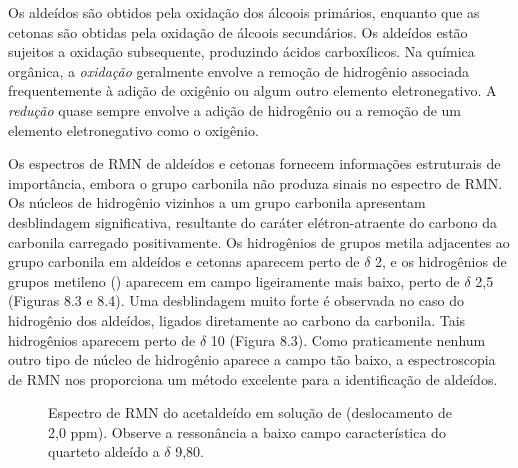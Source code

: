 \begin{tightcenter}
    \qquad
    \qquad
    \qquad
\end{tightcenter}


Os aldeídos são obtidos pela oxidação dos álcoois primários, enquanto que as cetonas são obtidas pela oxidação de álcoois secundários. Os aldeídos estão sujeitos a oxidação subsequente, produzindo ácidos carboxílicos. Na química orgânica, a \textit{oxidação} geralmente envolve a remoção de hidrogênio associada frequentemente à adição de oxigênio ou algum outro elemento eletronegativo. A \textit{redução} quase sempre envolve a adição de hidrogênio ou a remoção de um elemento eletronegativo como o oxigênio.


Os espectros de RMN de aldeídos e cetonas fornecem informações estruturais de importância, embora o grupo carbonila não produza sinais no espectro de RMN. Os núcleos de hidrogênio vizinhos a um grupo carbonila apresentam desblindagem significativa, resultante do caráter elétron-atraente do carbono da carbonila carregado positivamente. Os hidrogênios de grupos metila adjacentes ao grupo carbonila em aldeídos e cetonas aparecem perto de $\delta$ 2, e os hidrogênios de grupos metileno () aparecem em campo ligeiramente mais baixo, perto de $\delta$ 2,5 (Figuras 8.3 e 8.4). Uma desblindagem muito forte é observada no caso do hidrogênio dos aldeídos, ligados diretamente ao carbono da carbonila. Tais hidrogênios aparecem perto de $\delta$ 10 (Figura 8.3). Como praticamente nenhum outro tipo de núcleo de hidrogênio aparece a campo tão baixo, a espectroscopia de RMN nos proporciona um método excelente para a identificação de aldeídos.

\begin{figure}[H]
    \centering
    \caption{Espectro de RMN do acetaldeído em solução de  (deslocamento de 2,0 ppm). Observe a ressonância a baixo campo característica do quarteto aldeído a $\delta$ 9,80.}
    \label{fig8_3}
\end{figure}

